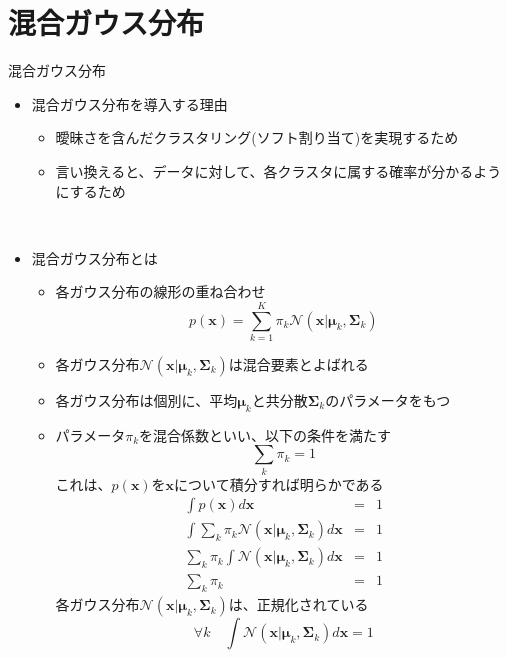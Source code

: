 \documentclass[dvipdfmx,notheorems,t]{beamer}
\begin{document}
\section{混合ガウス分布}

\begin{frame}{混合ガウス分布}

\begin{itemize}
	\item 混合ガウス分布を導入する理由
	\begin{itemize}
		\item 曖昧さを含んだクラスタリング(\alert{ソフト割り当て})を実現するため
		\item 言い換えると、データに対して、\alert{各クラスタに属する確率}が分かるようにするため
	\end{itemize} \
	
	\item \alert{混合ガウス分布}とは
	\begin{itemize}
		\item 各ガウス分布の\alert{線形の重ね合わせ}
		\begin{equation}
			p(\bm{x}) = \sum_{k = 1}^K \pi_k \mathcal{N}(\bm{x} | \bm{\mu}_k, \bm{\Sigma}_k)
		\end{equation}
		
		\item 各ガウス分布$\mathcal{N}(\bm{x} | \bm{\mu}_k, \bm{\Sigma}_k)$は\alert{混合要素}とよばれる
		\item 各ガウス分布は個別に、\alert{平均}$\bm{\mu}_k$と\alert{共分散}$\bm{\Sigma}_k$のパラメータをもつ
		\newline
		
		\item パラメータ$\pi_k$を\alert{混合係数}といい、以下の条件を満たす
		\begin{equation}
			\sum_k \pi_k = 1
		\end{equation}
		これは、$p(\bm{x})$を$\bm{x}$について積分すれば明らかである
		\begin{eqnarray}
			\int p(\bm{x}) d\bm{x} &=& 1\nonumber \\
			\int \sum_k \pi_k \mathcal{N}(\bm{x} | \bm{\mu}_k, \bm{\Sigma}_k) d\bm{x} &=& 1 \nonumber \\
			\sum_k \pi_k \int \mathcal{N}(\bm{x} | \bm{\mu}_k, \bm{\Sigma}_k) d\bm{x} &=& 1 \nonumber \\
			\sum_k \pi_k &=& 1 \nonumber
		\end{eqnarray}
		各ガウス分布$\mathcal{N}(\bm{x} | \bm{\mu}_k, \bm{\Sigma}_k)$は、正規化されている
		\begin{equation}
			\forall k \quad \int \mathcal{N}(\bm{x} | \bm{\mu}_k, \bm{\Sigma}_k) d\bm{x} = 1 \nonumber
		\end{equation}
		

\end{itemize}
\end{itemize}
\end{frame}
\end{document}
